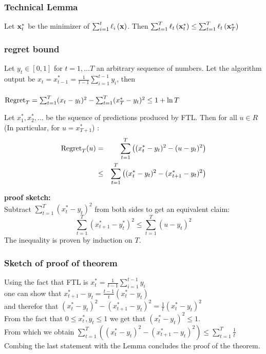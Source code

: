 \documentclass{beamer}
\begin{document}
\begin{frame}
\frametitle{Technical Lemma}
\begin{lemma}
  Let $\vx_t^*$ be the minimizer of $\sum_{i=1}^t \elloss{\vx}{i}$. Then
$  \sum_{t=1}^T \elloss{\vx_t^*}{t} \leq \sum_{t=1}^T \elloss{\vx_T^*}{t}$
  \end{lemma}
\end{frame}
\fi
\begin{frame}
\frametitle{regret bound}
\begin{theorem}
Let $y_t \in [0,1]$ for $t=1,\ldots T$ an arbitrary sequence of
numbers. Let the algorithm output be
$ x_t = x_{t-1}^* = \frac{1}{t-1} \sum_{i=1}^{t-1} y_i$, then\\
~\\
$ \regret_T = \sum_{t=1}^T (x_t-y_t)^2 - \sum_{t=1}^T (x^*_T-y_t)^2
\leq 1 + \ln T$
\end{theorem}
\end{frame}

\begin{tiny}
\begin{frame}
  \begin{lemma}
    Let $x_1^*, x_2^*,\ldots$ be the squence of predictions produced by FTL. Then for all $u \in R$ (In particular, for $u=x_{T+1}^*$) :
    \begin{eqnarray*}
      \regret_T(u) &=& \sum_{t=1}^T \left( (x_t^*-y_t)^2 - (u - y_t)^2\right)\\
      &\leq& \sum_{t=1}^T \left( (x_t^*-y_t)^2 - (x^*_{t+1}- y_t)^2\right)
    \end{eqnarray*}
  \end{lemma}
  {\bf proof sketch:}\\
  Subtract $\sum_{t=1}^T (x_t^*-y_t)^2$ from both sides to get an equivalent claim:
  \[
    \sum_{t=1}^T (x^*_{t+1}- y_t^*)^2 \leq \sum_{t=1}^T (u - y_t)^2
  \]
The inequality is proven by induction on $T$.
\end{frame}

\begin{frame}
\frametitle{Sketch of proof of theorem}
Using the fact that FTL is $x^*_t = \frac{1}{t-1} \sum_{i=1}^{t-1} y_i$ \\
one can show that $x_{t+1}^*-y_t = \frac{t-1}{t} (x_t^* - y_t)$\\
and therefor that $(x_t^*-y_t)^2 - (x_{t+1}^*-y_t)^2 = \frac{1}{t} (x_t^* - y_t)^2$\\
From the fact that $0\leq x_t^*,y_t \leq 1$ we get that $(x_t^*-y_t)^2\leq 1$.\\
From which we obtain $\sum_{t=1}^T ((x_t^* - y_t)^2-(x_{t+1}^* - y_t)^2) \leq
\sum_{t=1}^{T} \frac{1}{t}$\\
Combing the last statement with the Lemma concludes the proof of the theorem.

\end{frame}
\end{tiny}
\end{document}
